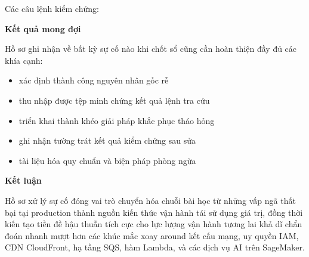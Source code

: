 Các câu lệnh kiểm chứng:

\begin{Shaded}
\begin{Highlighting}[]
\OperatorTok{=}
\OperatorTok{=}
\OperatorTok{=}
\OperatorTok{=}
\end{Highlighting}
\end{Shaded}

\vspace{0.5em}\noindent\textbf{Kết quả mong đợi}\par

Hồ sơ ghi nhận về bất kỳ sự cố nào khi chốt sổ cũng cần hoàn thiện đầy
đủ các khía cạnh:

\begin{itemize}
\tightlist
\item
  xác định thành công nguyên nhân gốc rễ
\item
  thu nhập được tệp minh chứng kết quả lệnh tra cứu
\item
  triển khai thành khéo giải pháp khắc phục tháo hỏng
\item
  ghi nhận tường trát kết quả kiểm chứng sau sửa
\item
  tài liệu hóa quy chuẩn và biện pháp phòng ngừa
\end{itemize}

\vspace{0.5em}\noindent\textbf{Kết luận}\par

Hồ sơ xử lý sự cố đóng vai trò chuyển hóa chuỗi bài học từ những vấp ngã
thất bại tại production thành nguồn kiến thức vận hành tái sử dụng giá
trị, đồng thời kiến tạo tiền đề hậu thuẫn tích cực cho lực lượng vận
hành tương lai khả dĩ chẩn đoán nhanh mượt hơn các khúc mắc xoay around
kết cấu mạng, uy quyền IAM, CDN CloudFront, hạ tầng SQS, hàm Lambda, và
các dịch vụ AI trên SageMaker.
